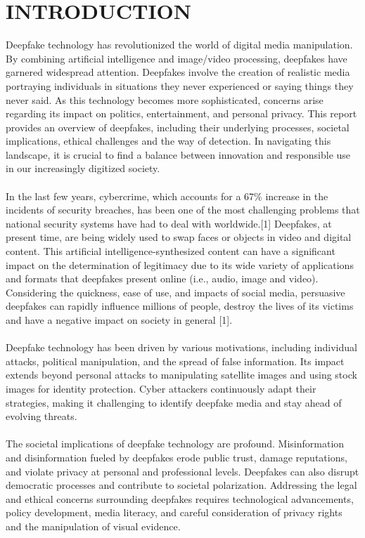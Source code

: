 \documentclass[12 pt]{article}
\begin{document}
\section{INTRODUCTION}
Deepfake technology has revolutionized the world of digital media manipulation. By combining artificial intelligence and image/video processing, deepfakes have garnered widespread attention. Deepfakes involve the creation of realistic media portraying individuals in situations they never experienced or saying things they never said. As this technology becomes more sophisticated, concerns arise regarding its impact on politics, entertainment, and personal privacy. This report provides an overview of deepfakes, including their underlying processes, societal implications, ethical challenges and the way of detection. In navigating this landscape, it is crucial to find a balance between innovation and responsible use in our increasingly digitized society.
\\
\\
In the last few years, cybercrime, which accounts for a 67\% increase in the incidents of security breaches, has been one of the most challenging problems that national security systems have had to deal with worldwide.[1]
Deepfakes, at present time, are being widely used to swap faces or objects in video and digital content. This artificial intelligence-synthesized
content can have a significant impact on the determination of legitimacy due to its wide variety of applications and formats that deepfakes present online (i.e., audio, image and video).
Considering the quickness, ease of use, and impacts of social media, persuasive deepfakes can rapidly influence millions of people, destroy the lives of its victims and have a negative impact on society in general [1].
\\\\ 
Deepfake technology has been driven by various motivations, including individual attacks, political manipulation, and the spread of false information. Its impact extends beyond personal attacks to manipulating satellite images and using stock images for identity protection. Cyber attackers continuously adapt their strategies, making it challenging to identify deepfake media and stay ahead of evolving threats.
\\\\
The societal implications of deepfake technology are profound. Misinformation and disinformation fueled by deepfakes erode public trust, damage reputations, and violate privacy at personal and professional levels. Deepfakes can also disrupt democratic processes and contribute to societal polarization. Addressing the legal and ethical concerns surrounding deepfakes requires technological advancements, policy development, media literacy, and careful consideration of privacy rights and the manipulation of visual evidence.
\end{document}
